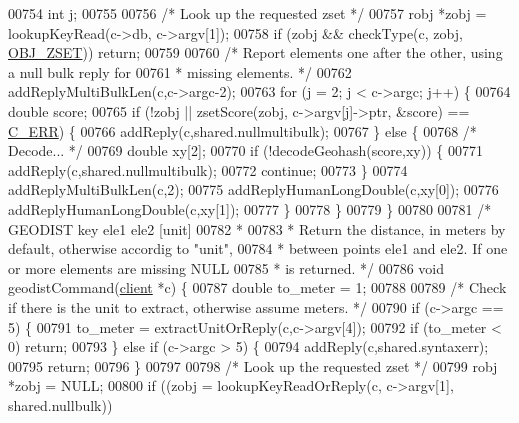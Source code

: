 \begin{DoxyCode}
{{{{{{{{{00754     \textcolor{keywordtype}{int} j;
00755 
00756     \textcolor{comment}{/* Look up the requested zset */}
00757     robj *zobj = lookupKeyRead(c->db, c->argv[1]);
00758     \textcolor{keywordflow}{if} (zobj && checkType(c, zobj, \hyperlink{server_8h_a8c356422ddbc03bd77694880a30a1953}{OBJ\_ZSET})) \textcolor{keywordflow}{return};
00759 
00760     \textcolor{comment}{/* Report elements one after the other, using a null bulk reply for}
00761 \textcolor{comment}{     * missing elements. */}
00762     addReplyMultiBulkLen(c,c->argc-2);
00763     \textcolor{keywordflow}{for} (j = 2; j < c->argc; j++) \{
00764         \textcolor{keywordtype}{double} score;
00765         \textcolor{keywordflow}{if} (!zobj || zsetScore(zobj, c->argv[j]->ptr, &score) == \hyperlink{server_8h_af98ac28d5f4d23d7ed5985188e6fb7d1}{C\_ERR}) \{
00766             addReply(c,shared.nullmultibulk);
00767         \} \textcolor{keywordflow}{else} \{
00768             \textcolor{comment}{/* Decode... */}
00769             \textcolor{keywordtype}{double} xy[2];
00770             \textcolor{keywordflow}{if} (!decodeGeohash(score,xy)) \{
00771                 addReply(c,shared.nullmultibulk);
00772                 \textcolor{keywordflow}{continue};
00773             \}
00774             addReplyMultiBulkLen(c,2);
00775             addReplyHumanLongDouble(c,xy[0]);
00776             addReplyHumanLongDouble(c,xy[1]);
00777         \}
00778     \}
00779 \}
00780 
00781 \textcolor{comment}{/* GEODIST key ele1 ele2 [unit]}
00782 \textcolor{comment}{ *}
00783 \textcolor{comment}{ * Return the distance, in meters by default, otherwise accordig to "unit",}
00784 \textcolor{comment}{ * between points ele1 and ele2. If one or more elements are missing NULL}
00785 \textcolor{comment}{ * is returned. */}
00786 \textcolor{keywordtype}{void} geodistCommand(\hyperlink{structclient}{client} *c) \{
00787     \textcolor{keywordtype}{double} to\_meter = 1;
00788 
00789     \textcolor{comment}{/* Check if there is the unit to extract, otherwise assume meters. */}
00790     \textcolor{keywordflow}{if} (c->argc == 5) \{
00791         to\_meter = extractUnitOrReply(c,c->argv[4]);
00792         \textcolor{keywordflow}{if} (to\_meter < 0) \textcolor{keywordflow}{return};
00793     \} \textcolor{keywordflow}{else} \textcolor{keywordflow}{if} (c->argc > 5) \{
00794         addReply(c,shared.syntaxerr);
00795         \textcolor{keywordflow}{return};
00796     \}
00797 
00798     \textcolor{comment}{/* Look up the requested zset */}
00799     robj *zobj = NULL;
00800     \textcolor{keywordflow}{if} ((zobj = lookupKeyReadOrReply(c, c->argv[1], shared.nullbulk))
}}}}}}}}}
\end{DoxyCode}
